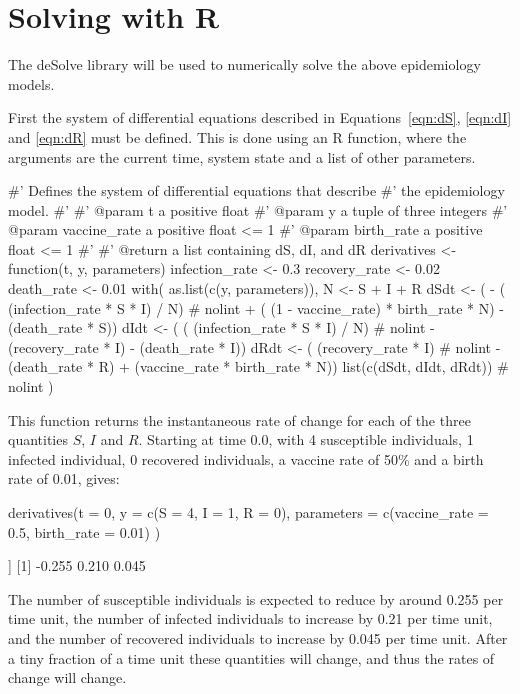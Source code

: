 \section{Solving with R}\label{sec:system_dynamics_solving-with-R}

The deSolve\autocite{soetaert2010solving} library will be used to numerically
solve the above epidemiology models.

First the system of differential equations described in Equations~\ref{eqn:dS},
\ref{eqn:dI} and \ref{eqn:dR} must be defined. This is done using an R function,
where the arguments are the current time, system state and a list of other
parameters.

\begin{Rin}
#' Defines the system of differential equations that describe
#' the epidemiology model.
#'
#' @param t a positive float
#' @param y a tuple of three integers
#' @param vaccine_rate a positive float <= 1
#' @param birth_rate a positive float <= 1
#'
#' @return a list containing dS, dI, and dR
derivatives <- function(t, y, parameters){
  infection_rate <- 0.3
  recovery_rate <- 0.02
  death_rate <- 0.01
  with(
    as.list(c(y, parameters)), {
      N <- S + I + R
      dSdt <- ( - ( (infection_rate * S * I) / N)  # nolint
        + ( (1 - vaccine_rate) * birth_rate * N)
        - (death_rate * S))
      dIdt <- ( ( (infection_rate * S * I) / N)  # nolint
        - (recovery_rate * I)
        - (death_rate * I))
      dRdt <- ( (recovery_rate * I)  # nolint
        - (death_rate * R)
        + (vaccine_rate * birth_rate * N))
      list(c(dSdt, dIdt, dRdt))  # nolint
    }
  )
}
\end{Rin}

This function returns the instantaneous rate of change for each of the
three quantities $S$, $I$ and $R$. Starting at time 0.0, with 4 susceptible
individuals, 1 infected individual, 0 recovered individuals, a vaccine rate
of 50\% and a birth rate of 0.01, gives:

\begin{Rin}
derivatives(t = 0,
  y = c(S = 4, I = 1, R = 0),
  parameters = c(vaccine_rate = 0.5, birth_rate = 0.01)
)
\end{Rin}

\begin{Rout}
[[1]]
[1] -0.255  0.210  0.045

\end{Rout}

The number of susceptible individuals is expected to reduce by around 0.255 per
time unit, the number of infected individuals to increase by 0.21 per time unit,
and the number of recovered individuals to increase by 0.045 per time unit.
After a tiny fraction of a time unit these quantities will change, and thus the
rates of change will change.

